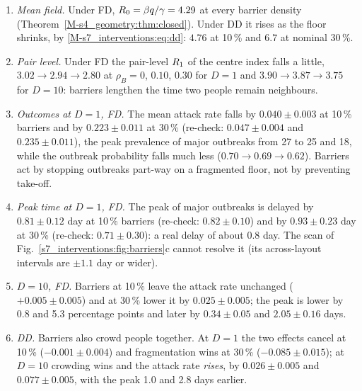 \begin{enumerate}[label=(\roman*),leftmargin=*,itemsep=2pt,topsep=3pt]
\item \emph{Mean field.} Under FD, $R_0=\beta q/\gamma=4.29$ at every barrier density
  (Theorem~\ref{M-s4_geometry:thm:closed}). Under DD it rises as the floor shrinks,
  by \eqref{M-s7_interventions:eq:dd}: $4.76$ at 10\,\% and $6.7$ at nominal 30\,\%.
\item \emph{Pair level.} Under FD the pair-level $R_1$ of the centre index falls a little, $3.02\to2.94\to2.80$
  at $\rho_B=0$, $0.10$, $0.30$ for $D=1$ and $3.90\to3.87\to3.75$ for $D=10$: barriers lengthen the time two
  people remain neighbours.
\item \emph{Outcomes at $D=1$, FD.} The mean attack rate falls by $0.040\pm0.003$ at 10\,\% barriers and by
  $0.223\pm0.011$ at 30\,\% (re-check: $0.047\pm0.004$ and $0.235\pm0.011$), the peak prevalence of major
  outbreaks from 27\pct{} to 25\pct{} and 18\pct, while the outbreak probability falls much
  less ($0.70\to0.69\to0.62$). Barriers act by stopping outbreaks part-way on a fragmented floor, not by
  preventing take-off.
\item \emph{Peak time at $D=1$, FD.} The peak of major outbreaks is delayed by $0.81\pm0.12$ day at 10\,\%
  barriers (re-check: $0.82\pm0.10$) and by $0.93\pm0.23$ day at 30\,\% (re-check: $0.71\pm0.30$): a real delay
  of about 0.8 day. The scan of
  Fig.~\ref{s7_interventions:fig:barriers}c cannot resolve it (its across-layout intervals are $\pm1.1$ day or
  wider).
\item \emph{$D=10$, FD.} Barriers at 10\,\% leave the attack rate unchanged ($+0.005\pm0.005$) and at 30\,\%
  lower it by $0.025\pm0.005$; the peak is lower by 0.8 and 5.3 percentage points and later by $0.34\pm0.05$
  and $2.05\pm0.16$ days.
\item \emph{DD.} Barriers also crowd people together. At $D=1$ the two effects cancel at 10\,\%
  ($-0.001\pm0.004$) and fragmentation wins at 30\,\% ($-0.085\pm0.015$); at $D=10$ crowding wins and the
  attack rate \emph{rises}, by $0.026\pm0.005$ and $0.077\pm0.005$, with the peak 1.0 and 2.8 days earlier.
\end{enumerate}
